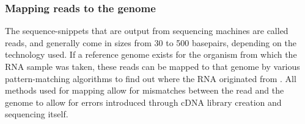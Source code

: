 \subsubsection{Mapping reads to the genome}
The sequence-snippets that are output from sequencing machines are called
reads, and generally come in sizes from 30 to 500 basepairs, depending on the
technology used. If a reference genome exists for the organism from which the
RNA sample was taken, these reads can be mapped to that genome by various
pattern-matching algorithms to find out where the RNA originated from
\cite{garber_computational_2011}. All methods used for mapping allow for
mismatches between the read and the genome to allow for errors introduced
through cDNA library creation and sequencing itself.
